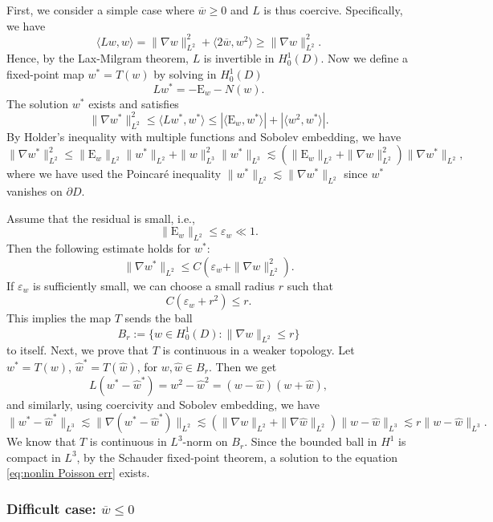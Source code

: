 \documentclass[11pt,a4paper]{article}
\numberwithin{equation}{section}
\newcommand{\Epsilon}{\mathrm{E}}
\newcommand{\assign}{:=}
\begin{document}
First, we consider a simple case where $\overline{w} \geqslant 0$ and $L$ is
thus coercive. Specifically, we have
\[ \langle L w, w \rangle = \| \nabla w \|_{L^2}^2 + \langle 2 \overline{w}, w^2\rangle
   \geqslant \| \nabla w \|_{L^2}^2 . \]
Hence, by the Lax-Milgram theorem, $L$ is invertible in $H^1_0 (D)$. Now we define
a fixed-point map $w^{\ast} = T (w)$ by solving in $H^1_0 (D)$
\[ L w^{\ast} = - \Epsilon_w - N (w) . \]
The solution $w^{\ast}$ exists and satisfies
\[ \| \nabla w^{\ast} \|_{L^2}^2 \leqslant \langle L w^{\ast}, w^{\ast} \rangle
   \leqslant | \langle \Epsilon_w, w^{\ast} \rangle | + | \langle w^2,
   w^{\ast} \rangle | . \]
By Holder's inequality with multiple functions and Sobolev embedding, we have
\[ \| \nabla w^{\ast} \|_{L^2}^2 \leqslant \| \Epsilon_w \|_{L^2} \| w^{\ast} \|_{L^2} +
   \| w \|_{L^3}^2 \| w^{\ast} \|_{L^3}\lesssim (\| \Epsilon_w \|_{L^2} + \|
   \nabla w \|_{L^2}^2) \| \nabla w^{\ast} \|_{L^2} , \]where we have used the Poincar\'e inequality $\|w^{*}\|_{L^2}\lesssim\|\nabla w^{*}\|_{L^2}$ since $w^{*}$ vanishes on $\partial D$.

   
Assume that the residual is small, i.e.,
\[ \| \Epsilon_w \|_{L^2} \leqslant \varepsilon_w \ll 1. \]
Then the following estimate holds for $w^{\ast}$:
\[ \| \nabla w^{\ast} \|_{L^2} \leqslant C (\varepsilon_w + \| \nabla w \|_{L^2}^2) .
\]
If $\varepsilon_w$ is sufficiently small, we can choose a small radius $r
$ such that
\[ C (\varepsilon_w + r ^2) \leqslant r
    . \]
This implies the map $T$ sends the ball
\[ B_{r} \assign \{ w \in H^1_0 (D) : \| \nabla w \|_{L^2}
   \leqslant r  \} \]
to itself. Next, we prove that $T$ is continuous in a weaker topology. Let $w^{\ast} = T
(w)$, $\widehat{w}^{\ast} = T
(\widehat{w})$, for $w,\widehat{w}\in B_{r }$. Then we get
\[ L (w^{\ast} - \widehat{w}^{\ast}) = w^2 - \widehat{w}^2 = (w - \widehat{w}) (w + \widehat{w}), \]
and similarly, using coercivity and Sobolev embedding, we have 
\[ \|  w^{\ast} -  \widehat{w}^{\ast} \|_{L^3} \lesssim \| \nabla( w^{\ast} -  \widehat{w}^{\ast}) \|_{L^2} \lesssim (\| \nabla w \|_{L^2}
   + \| \nabla \widehat{w} \|_{L^2}) \|  w -  \widehat{w} \|_{L^3} \lesssim r
    \|  w-  \widehat{w} \|_{L^3} . \]
We know that $T$ is continuous in $L^3$-norm on $B_{r }$. Since the bounded ball in $H^1$ is compact in $L^3$, by the Schauder fixed-point theorem, a solution to the equation \eqref{eq:nonlin
Poisson err} exists.

\subsubsection{Difficult case: \texorpdfstring{$\overline{w} \leqslant 0$}{overline{w} <= 0}}
\end{document}
